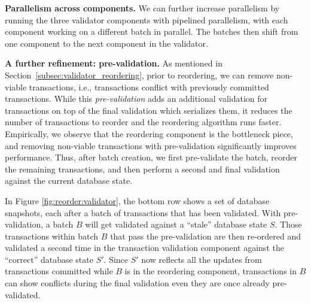 {\bf Parallelism across components.}
We can further increase parallelism by running the three validator components with pipelined parallelism, 
with each component working on a different batch in parallel. The batches then shift from one component to the next component in the validator.

{\bf A further refinement: pre-validation.} As mentioned in Section~\ref{subsec:validator_reordering}, prior to reordering, we can remove non-viable transactions, i.e., transactions conflict with previously committed transactions. While this \emph{pre-validation} adds an additional validation for transactions on top of the final validation which serializes them, it reduces the number of transactions to reorder and the reordering algorithm runs faster. Empirically, we observe that the reordering component is the bottleneck piece, and removing non-viable transactions with pre-validation significantly improves performance. Thus, after batch creation, we first pre-validate the batch, reorder the remaining transactions, and then perform a second and final validation against the current database state.

In Figure \ref{fig:reorder:validator}, the bottom row shows a set of database snapshots, each after a batch of transactions that has been validated. With pre-validation, a batch $B$ will get validated against a ``stale'' database state $S$. Those transactions within batch $B$ that pass the pre-validation are then re-ordered and validated a second time in the transaction validation component against the ``correct'' database state $S'$. Since $S'$ now reflects all the updates from transactions committed while $B$ is in the reordering component, transactions in $B$ can show conflicts during the final validation even  they are once already pre-validated.



